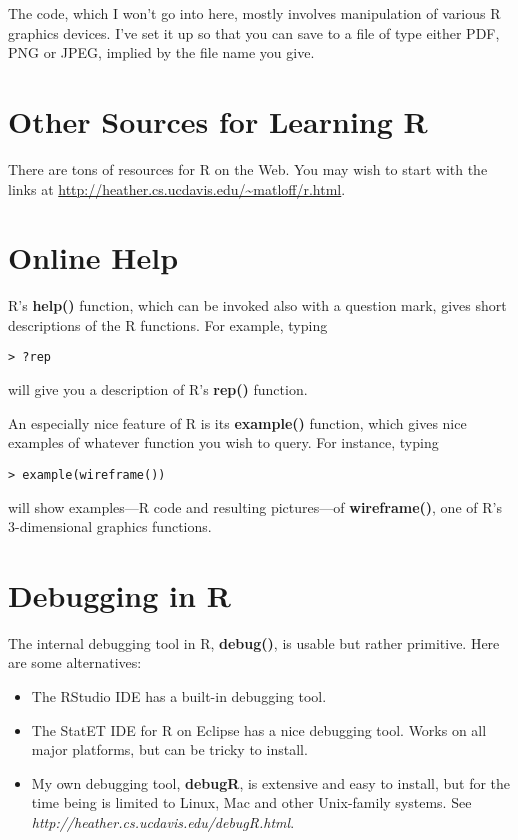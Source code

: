 The code, which I won't go into here, mostly involves manipulation of
various R graphics devices.  I've set it up so that you can save to a
file of type either PDF, PNG or JPEG, implied by the file name you give.

\section{Other Sources for Learning R}

There are tons of resources for R on the Web.  You may wish to start
with the links at \url{http://heather.cs.ucdavis.edu/~matloff/r.html}.

\section{Online Help}

R's {\bf help()} function, which can be invoked also with a
question mark, gives short descriptions of the R functions. For
example, typing

\begin{Verbatim}[fontsize=\relsize{-2}]
> ?rep
\end{Verbatim}

will give you a description of R's {\bf rep()} function.

An especially nice feature of R is its {\bf example()} function, which
gives nice examples of whatever function you wish to query. For
instance, typing

\begin{lstlisting}
> example(wireframe())
\end{lstlisting}

will show examples---R code and resulting pictures---of {\bf wireframe()},
one of R's 3-dimensional graphics functions.

\section{Debugging in R}

The internal debugging tool in R, {\bf debug()}, is usable but rather
primitive.  Here are some alternatives:

\begin{itemize}

\item The RStudio IDE has a built-in debugging tool.

\item The StatET IDE for R on Eclipse has a nice debugging tool.  Works
on all major platforms, but can be tricky to install.

\item My own debugging tool, {\bf debugR}, is extensive and easy to
install, but for the time being is limited to Linux, Mac and other
Unix-family systems.  See {\it
http://heather.cs.ucdavis.edu/debugR.html}.

\end{itemize}

